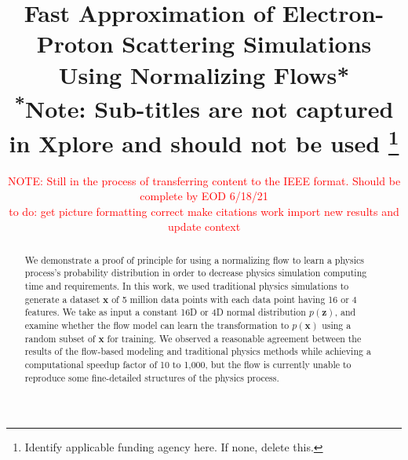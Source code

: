 \documentclass[conference]{IEEEtran}
\begin{document}
\title{Fast Approximation of Electron-Proton Scattering Simulations Using Normalizing Flows*\\
{\footnotesize \textsuperscript{*}Note: Sub-titles are not captured in Xplore and
should not be used}
\thanks{Identify applicable funding agency here. If none, delete this.}
}

\author{
\and
{}
\and
{}
\and
{}
\and
\textcolor{red}{NOTE: Still in the process of transferring content to the IEEE format. Should be complete by EOD 6/18/21}\\
\textcolor{red}{to do:
get picture formatting correct
make citations work
import new results and update context}
}

\maketitle

\begin{abstract}
We demonstrate a proof of principle for using a normalizing flow to learn a physics process's probability distribution in order to decrease physics simulation computing time and requirements. In this work, we used traditional physics simulations to generate a dataset $\mathbf{x}$ of 5 million data points with each data point having 16 or 4 features.  We take as input a constant 16D or 4D normal distribution $p(\mathbf{z})$, and examine whether the flow model can learn the transformation to $p(\mathbf{x})$ using a random subset of $\mathbf{x}$ for training. We observed a reasonable agreement between the results of the flow-based modeling and traditional physics methods while achieving a computational speedup factor of 10 to 1,000, but the flow is currently unable to reproduce some fine-detailed structures of the physics process.
\end{abstract}
\end{document}
